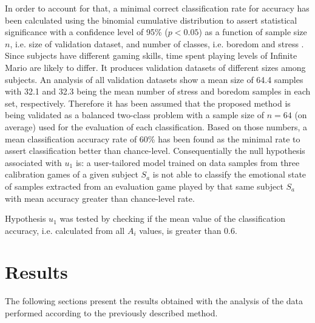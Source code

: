 In order to account for that, a minimal correct classification rate for accuracy has been calculated using the binomial cumulative distribution to assert statistical significance with a confidence level of 95\% ($p < 0.05$) as a function of sample size $n$, i.e. size of validation dataset, and number of classes, i.e. boredom and stress \parencite{combrisson2015exceeding}. Since subjects have different gaming skills, time spent playing levels of Infinite Mario are likely to differ. It produces validation datasets of different sizes among subjects. An analysis of all validation datasets show a mean size of 64.4 samples with 32.1 and 32.3 being the mean number of stress and boredom samples in each set, respectively. Therefore it has been assumed that the proposed method is being validated as a balanced two-class problem with a sample size of $n=64$ (on average) used for the evaluation of each classification. Based on those numbers, a mean classification accuracy rate of 60\% has been found as the minimal rate to assert classification better than chance-level. Consequentially the null hypothesis associated with $u_1$ is: a user-tailored model trained on data samples from three calibration games of a given subject $S_a$ is not able to classify the emotional state of samples extracted from an evaluation game played by that same subject $S_a$ with mean accuracy greater than chance-level rate.

Hypothesis $u_1$ was tested by checking if the mean value of the classification accuracy, i.e. calculated from all $A_i$ values, is greater than 0.6.


\section{Results}
\label{sec:experiment2-results}

The following sections present the results obtained with the analysis of the data performed according to the previously described method.

